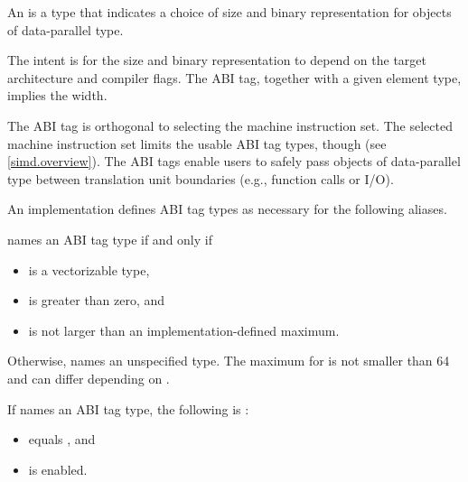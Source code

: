 \begin{itemdescr}
\pnum
An  is a type that indicates a choice of size and binary
representation for objects of data-parallel type.
\begin{note}
The intent is for the size and binary representation to depend on the target
architecture and compiler flags.
The ABI tag, together with a given element type, implies the width.
\end{note}

\pnum
\begin{note}
The ABI tag is orthogonal to selecting the machine instruction set.
The selected machine instruction set limits the usable ABI tag types, though
(see \ref{simd.overview}).
The ABI tags enable users to safely pass objects of data-parallel type between
translation unit boundaries (e.g., function calls or I/O).
\end{note}

\pnum
An implementation defines ABI tag types as necessary for the following aliases.

\pnum
{} names an ABI tag type if and only if
\begin{itemize}
\item {} is a vectorizable type,
\item {} is greater than zero, and
\item {} is not larger than an implementation-defined maximum.
\end{itemize}
Otherwise,  names an unspecified type.
The  maximum for
 is not smaller than 64 and can differ depending on .

\pnum
If  names an ABI tag type,
the following is :
\begin{itemize}
\item
  equals , and
\item
  is enabled.
\end{itemize}


\end{itemdescr}
